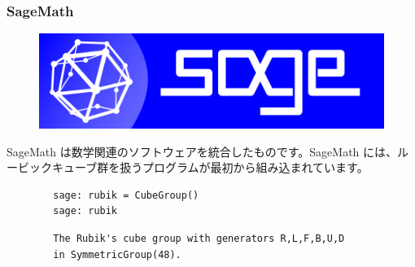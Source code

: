 \documentclass{beamer}
\begin{document}
\begin{frame}[fragile=singleslide]
    \frametitle{SageMath}

    \begin{figure}
        \includegraphics[scale=0.25]{images/logo_sagemath+icon_oldstyle.png}
    \end{figure}

    SageMath は数学関連のソフトウェアを統合したものです。SageMath には、ルービックキューブ群を扱うプログラムが最初から組み込まれています。

    \bigskip

    \begin{verbatim}
        sage: rubik = CubeGroup()
        sage: rubik
    \end{verbatim}
    \begin{verbatim}
        The Rubik's cube group with generators R,L,F,B,U,D
        in SymmetricGroup(48).
    \end{verbatim}
\end{frame}
\end{document}
